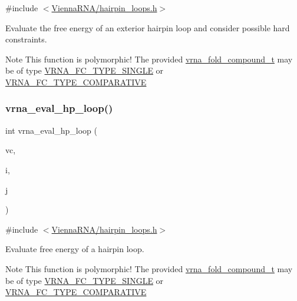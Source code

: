 {\ttfamily \#include $<$\hyperlink{hairpin__loops_8h}{Vienna\+R\+N\+A/hairpin\+\_\+loops.\+h}$>$}



Evaluate the free energy of an exterior hairpin loop and consider possible hard constraints. 

\begin{DoxyNote}{Note}
This function is polymorphic! The provided \hyperlink{group__fold__compound_ga1b0cef17fd40466cef5968eaeeff6166}{vrna\+\_\+fold\+\_\+compound\+\_\+t} may be of type \hyperlink{group__fold__compound_gga01a4ff86fa71deaaa5d1abbd95a1447da7e264dd3cf2dc9b6448caabcb7763cd6}{V\+R\+N\+A\+\_\+\+F\+C\+\_\+\+T\+Y\+P\+E\+\_\+\+S\+I\+N\+G\+LE} or \hyperlink{group__fold__compound_gga01a4ff86fa71deaaa5d1abbd95a1447dab821ce46ea3cf665be97df22a76f5023}{V\+R\+N\+A\+\_\+\+F\+C\+\_\+\+T\+Y\+P\+E\+\_\+\+C\+O\+M\+P\+A\+R\+A\+T\+I\+VE} 
\end{DoxyNote}
\mbox{\label{group__loops_gab3eb4651dc26dc2b653a57dd340d7e68}} 
\subsubsection{\texorpdfstring{vrna\+\_\+eval\+\_\+hp\+\_\+loop()}{vrna\_eval\_hp\_loop()}}
{\footnotesize\ttfamily int vrna\+\_\+eval\+\_\+hp\+\_\+loop (\begin{DoxyParamCaption}\item[{\hyperlink{group__fold__compound_ga1b0cef17fd40466cef5968eaeeff6166}{vrna\+\_\+fold\+\_\+compound\+\_\+t} $\ast$}]{vc,  }\item[{int}]{i,  }\item[{int}]{j }\end{DoxyParamCaption})}



{\ttfamily \#include $<$\hyperlink{hairpin__loops_8h}{Vienna\+R\+N\+A/hairpin\+\_\+loops.\+h}$>$}



Evaluate free energy of a hairpin loop. 

\begin{DoxyNote}{Note}
This function is polymorphic! The provided \hyperlink{group__fold__compound_ga1b0cef17fd40466cef5968eaeeff6166}{vrna\+\_\+fold\+\_\+compound\+\_\+t} may be of type \hyperlink{group__fold__compound_gga01a4ff86fa71deaaa5d1abbd95a1447da7e264dd3cf2dc9b6448caabcb7763cd6}{V\+R\+N\+A\+\_\+\+F\+C\+\_\+\+T\+Y\+P\+E\+\_\+\+S\+I\+N\+G\+LE} or \hyperlink{group__fold__compound_gga01a4ff86fa71deaaa5d1abbd95a1447dab821ce46ea3cf665be97df22a76f5023}{V\+R\+N\+A\+\_\+\+F\+C\+\_\+\+T\+Y\+P\+E\+\_\+\+C\+O\+M\+P\+A\+R\+A\+T\+I\+VE}
\end{DoxyNote}

